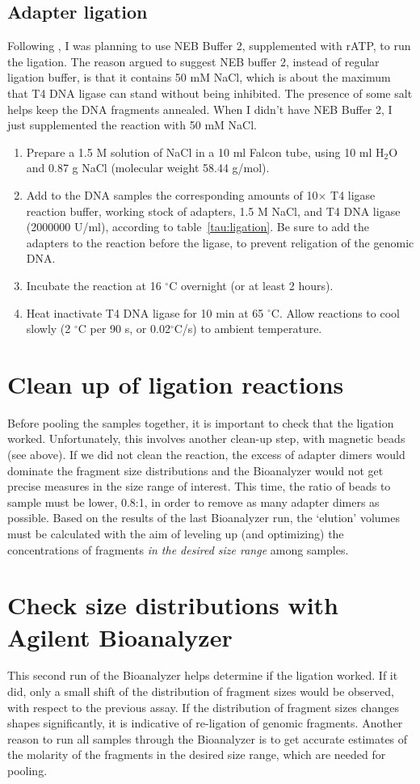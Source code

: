 \documentclass[a4paper,12pt]{article}
\begin{document}
\subsection{Adapter ligation}
Following \cite{Etter2011}, I was planning to use NEB Buffer 2, supplemented with rATP, to run the ligation.  The reason argued to suggest NEB buffer 2, instead of regular ligation buffer, is that it contains 50 mM NaCl, which is about the maximum that T4 DNA ligase can stand without being inhibited. The presence of some salt helps keep the DNA fragments annealed. When I didn't have NEB Buffer 2, I just supplemented the reaction with 50 mM NaCl.
\begin{enumerate}
\item Prepare a 1.5 M solution of NaCl in a 10 ml Falcon tube, using 10 ml H$_2$O and 0.87 g NaCl (molecular weight 58.44 g/mol).
\item Add to the DNA samples the corresponding amounts of 10$\times$ T4 ligase reaction buffer, working stock of adapters, 1.5 M NaCl, and T4 DNA ligase (2000000 U/ml), according to table~\ref{tau:ligation}. Be sure to add the adapters to the reaction before the ligase, to prevent religation of the genomic DNA.
\item Incubate the reaction at 16 $^{\circ}$C overnight (or at least 2 hours).
\item Heat inactivate T4 DNA ligase for 10 min at 65 $^{\circ}$C. Allow reactions to cool slowly (2 $^{\circ}$C per 90 s, or 0.02$^{\circ}$C/s) to ambient temperature.
\end{enumerate}

\section{Clean up of ligation reactions}
Before pooling the samples together, it is important to check that the ligation worked. Unfortunately, this involves another clean-up step, with magnetic beads (see above). If we did not clean the reaction, the excess of adapter dimers would dominate the fragment size distributions and the Bioanalyzer would not get precise measures in the size range of interest. This time, the ratio of beads to sample must be lower, 0.8:1, in order to remove as many adapter dimers as possible. Based on the results of the last Bioanalyzer run, the `elution' volumes must be calculated with the aim of leveling up (and optimizing) the concentrations of fragments \emph{in the desired size range} among samples.

\section{Check size distributions with Agilent Bioanalyzer}
This second run of the Bioanalyzer helps determine if the ligation worked. If it did, only a small shift of the distribution of fragment sizes would be observed, with respect to the previous assay. If the distribution of fragment sizes changes shapes significantly, it is indicative of re-ligation of genomic fragments. Another reason to run all samples through the Bioanalyzer is to get accurate estimates of the molarity of the fragments in the desired size range, which are needed for pooling.
\end{document}
